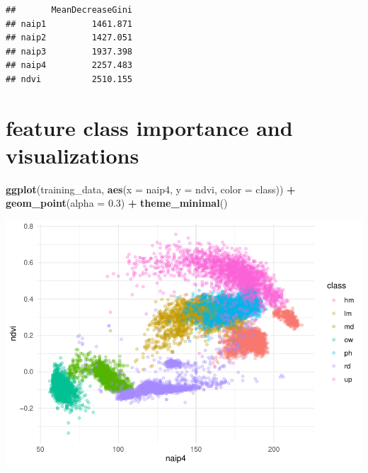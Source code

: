 \documentclass[
]{article}
\newenvironment{Shaded}{\begin{snugshade}}{\end{snugshade}}
\newcommand{\AttributeTok}[1]{\textcolor[rgb]{0.13,0.29,0.53}{#1}}
\newcommand{\CommentTok}[1]{\textcolor[rgb]{0.56,0.35,0.01}{\textit{#1}}}
\newcommand{\ConstantTok}[1]{\textcolor[rgb]{0.56,0.35,0.01}{#1}}
\newcommand{\FloatTok}[1]{\textcolor[rgb]{0.00,0.00,0.81}{#1}}
\newcommand{\FunctionTok}[1]{\textcolor[rgb]{0.13,0.29,0.53}{\textbf{#1}}}
\newcommand{\NormalTok}[1]{#1}
\newcommand{\SpecialCharTok}[1]{\textcolor[rgb]{0.81,0.36,0.00}{\textbf{#1}}}
\newcommand{\StringTok}[1]{\textcolor[rgb]{0.31,0.60,0.02}{#1}}
\begin{document}
\begin{Shaded}
\end{Shaded}

\begin{verbatim}
##       MeanDecreaseGini
## naip1         1461.871
## naip2         1427.051
## naip3         1937.398
## naip4         2257.483
## ndvi          2510.155
\end{verbatim}

\section{feature class importance and
visualizations}\label{feature-class-importance-and-visualizations-2}

\begin{Shaded}
\begin{Highlighting}[]
\FunctionTok{ggplot}\NormalTok{(training\_data, }\FunctionTok{aes}\NormalTok{(}\AttributeTok{x =}\NormalTok{ naip4, }\AttributeTok{y =}\NormalTok{ ndvi, }\AttributeTok{color =}\NormalTok{ class)) }\SpecialCharTok{+}
  \FunctionTok{geom\_point}\NormalTok{(}\AttributeTok{alpha =} \FloatTok{0.3}\NormalTok{) }\SpecialCharTok{+}
  \FunctionTok{theme\_minimal}\NormalTok{()}
\end{Highlighting}
\end{Shaded}

\includegraphics{veg_model_files/figure-latex/unnamed-chunk-13-1.pdf}
\end{document}
